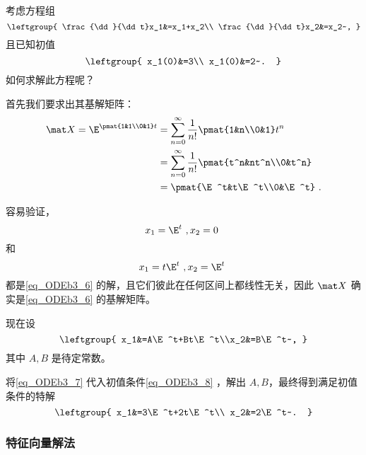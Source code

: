 \begin{example}{}
考虑方程组
\begin{equation}\label{eq_ODEb3_6}
\leftgroup{
    \frac{\dd}{\dd t}x_1&=x_1+x_2\\
    \frac{\dd}{\dd t}x_2&=x_2~,
}
\end{equation}
且已知初值
\begin{equation}\label{eq_ODEb3_8}
\leftgroup{
    x_1(0)&=3\\
    x_1(0)&=2~.
}
\end{equation}
如何求解此方程呢？

首先我们要求出其基解矩阵：
\begin{equation}
\begin{aligned}
\mat X=\E^{\pmat{1&1\\0&1}t}&=\sum_{n=0}^\infty\frac{1}{n!}\pmat{1&n\\0&1}t^n\\
&=\sum_{n=0}^\infty\frac{1}{n!}\pmat{t^n&nt^n\\0&t^n}\\
&=\pmat{\E^t&t\E^t\\0&\E^t}~.
\end{aligned}
\end{equation}

容易验证，
\begin{equation}
x_1=\E^t~, x_2=0~
\end{equation}
和
\begin{equation}
x_1=t\E^t~, x_2=\E^t~
\end{equation}
都是\autoref{eq_ODEb3_6} 的解，且它们彼此在任何区间上都线性无关，因此 $\mat X$ 确实是\autoref{eq_ODEb3_6} 的基解矩阵。

现在设
\begin{equation}\label{eq_ODEb3_7}
\leftgroup{
x_1&=A\E^t+Bt\E^t\\x_2&=B\E^t~,
}
\end{equation}
其中 $A, B$ 是待定常数。

将\autoref{eq_ODEb3_7} 代入初值条件\autoref{eq_ODEb3_8} ，解出 $A, B$，最终得到满足初值条件的特解
\begin{equation}
\leftgroup{
    x_1&=3\E^t+2t\E^t\\
    x_2&=2\E^t~.
}
\end{equation}


\end{example}

\subsubsection{特征向量解法}


